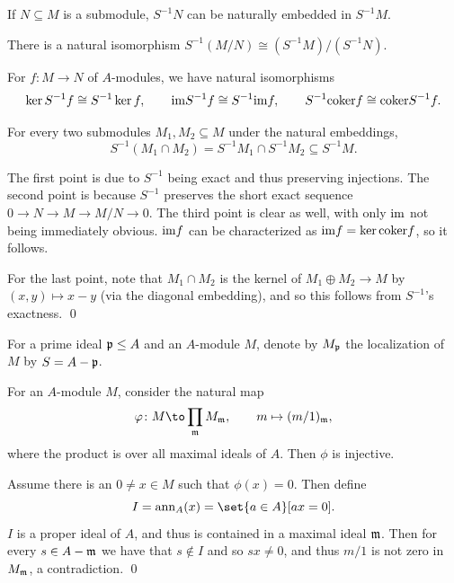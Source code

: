 \enote

\bcoro

    \benum
        \item If $N\subseteq M$ is a submodule, $S^{-1}N$ can be naturally embedded in $S^{-1}M$.
        \item There is a natural isomorphism $S^{-1}(M/N)\cong (S^{-1}M)/(S^{-1}N)$.
        \item For $f\colon M\to N$ of $A$-modules, we have natural isomorphisms
        $$ \mathop{\rm ker} S^{-1}f \cong S^{-1}\mathop{\rm ker} f,\qquad {\rm im} S^{-1}f \cong S^{-1}{\rm im} f,\qquad S^{-1}{\rm coker} f\cong{\rm coker} S^{-1}f . $$
        \item For every two submodules $M_1,M_2\subseteq M$ under the natural embeddings,
        $$ S^{-1}(M_1\cap M_2) = S^{-1}M_1\cap S^{-1}M_2 \subseteq S^{-1}M . $$
    \eenum

\ecoro

\bproof

    The first point is due to $S^{-1}$ being exact and thus preserving injections.
    The second point is because $S^{-1}$ preserves the short exact sequence $0\to N\to M\to M/N\to0$.
    The third point is clear as well, with only ${\rm im}$ not being immediately obvious.
    ${\rm im} f$ can be characterized as ${\rm im} f=\mathop{\rm ker}{\rm coker} f$, so it follows.

    For the last point, note that $M_1\cap M_2$ is the kernel of $M_1\oplus M_2\to M$ by $(x,y)\mapsto x-y$
    (via the diagonal embedding), and so this follows from $S^{-1}$'s exactness.
    \qed

\eproof

\bdefn

    For a prime ideal ${{\frak p}}\leq A$ and an $A$-module $M$, denote by $M_{{\frak p}}$ the localization of $M$ by $S=A-{{\frak p}}$.

\edefn

\blemm

    For an $A$-module $M$, consider the natural map
    $$ \phi\colon M\to\prod_\m M_\m,\qquad m\mapsto (m/1)_\m , $$
    where the product is over all maximal ideals of $A$.
    Then $\phi$ is injective.

\elemm

\bproof

    Assume there is an $0\neq x\in M$ such that $\phi(x)=0$.
    Then define
    $$ I = \ann_A(x) = \set{a\in A}[ax=0] . $$
    $I$ is a proper ideal of $A$, and thus is contained in a maximal ideal ${{\frak m}}$.
    Then for every $s\in A-{{\frak m}}$ we have that $s\notin I$ and so $sx\neq0$, and thus $m/1$ is not zero in $M_{{\frak m}}$, a contradiction.
    \qed

